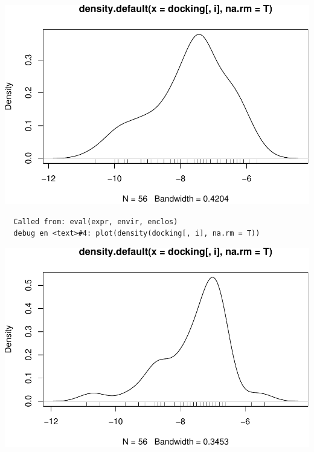 \documentclass[12pt,twoside]{reedthesis}
\begin{document}
  \begin{Shaded}
  \begin{Highlighting}[]
  \StringTok{ }\NormalTok{(}\NormalTok{, }\NormalTok{, }\NormalTok{)}
  
   \OperatorTok{:}\NormalTok{)}
  \NormalTok{\{}\NormalTok{(}\NormalTok{()\}}
  \end{Highlighting}
  \end{Shaded}
  
  \begin{center}\includegraphics{tesis_files/figure-latex/johan-1} \end{center}
  
  \begin{verbatim}
  Called from: eval(expr, envir, enclos)
  debug en <text>#4: plot(density(docking[, i], na.rm = T))
  \end{verbatim}
  
  \begin{center}\includegraphics{tesis_files/figure-latex/johan-2} \end{center}
  
\end{document}
